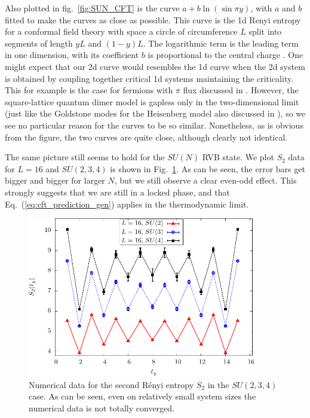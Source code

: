 \documentclass[11pt]{iopart}
\begin{document}
Also plotted in fig.~\ref{fig:SUN_CFT} is the curve $a+b\ln (\sin \pi y)$, with $a$ and $b$ fitted to make the curves as close as possible. This curve is the 1d Renyi entropy for a conformal field theory with space a circle of circumference $L$ split into segments of length $yL$ and $(1-y)L$. The logarithmic term  is the leading term in one dimension, with its coefficient $b$ is proportional to the central charge \cite{Cardy}. One might expect that our 2d curve would resembles the 1d curve when the 2d system is obtained by coupling together critical 1d systems maintaining the criticality. This for example is the case for fermions with $\pi$ flux discussed in \cite{Ju2012}. However, the square-lattice quantum dimer model is gapless only in the two-dimensional limit (just like the Goldstone modes for the Heisenberg model also discussed in \cite{Ju2012}), so we see no particular reason for the curves to be so similar. Nonetheless, as is obvious from the figure, the two curves are quite close, although clearly not identical. 



The same picture still seems to hold for the $SU(N)$ RVB state. We plot $S_2$ data for $L=16$ and $SU(2,3,4)$ is shown in Fig.~\ref{fig:SUN_shape}. As can be seen, the error bars get bigger and bigger for larger $N$, but we still observe a clear even-odd effect. This strongly suggests that we are still in a locked phase, and that Eq.~(\ref{eq:cft_prediction_gen}) applies in the thermodynamic limit. 
\begin{figure}[ht]
 \begin{center}
  \includegraphics[width=10cm]{./figures/SUN_shape.pdf}
 \end{center}
\caption{Numerical data for the second R\'enyi entropy $S_2$ in the $SU(2,3,4)$ case. As can be seen, even on relatively small system sizes the numerical data is not totally converged. }
\label{fig:SUN_shape}
\end{figure}
\end{document}
